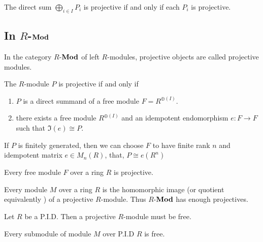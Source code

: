 \documentclass[12pt, oneside]{book}
\begin{document}
\begin{corollary}
    The direct sum $\bigoplus_{i \in I} {P}_i$ is projective if and only if each ${P}_i$ is projective.
\end{corollary}

\subsection{In $R$-$\mathbf{Mod}$}
In the category $R$-$\mathbf{Mod}$ of left $R$-modules, projective objects are called projective modules.


\begin{theorem}
    \label{thm: Equivalent conditions of projective}
    The $R$-module $P$ is projective if and only if
    \begin{enumerate}
        \item
              $P$ is a direct summand of a free module $F=R^{\oplus(I)}$.
        \item
              there exists a free module $R^{\oplus(I)}$ and an idempotent endomorphism $e:F\rightarrow F$ such that $\Im\left( e \right)\cong P$.
    \end{enumerate}
    \begin{remark}
        If $P$ is finitely generated, then we can choose $F$ to have finite rank $n$ and idempotent matrix $e\in M_n\left( R \right)$, that, $P\cong e \left(R^n \right)$
    \end{remark}
\end{theorem}


\begin{theorem}
    \label{thm: Free module is projective}
    Every free module $F$ over a ring $R$ is projective.
\end{theorem}

\begin{corollary}
    \label{cor: Every module $M$ over a ring $R$ is the homomorphic image of a projective $R$-module.}
    Every module $M$ over a ring $R$ is the homomorphic image (or quotient equivalently ) of a projective $R$-module.
    Thus $R$-$\mathbf{Mod}$ has enough projectives.
\end{corollary}










\begin{theorem}
    Let $R$ be a P.I.D.
    Then a projective $R$-module must be free.
\end{theorem}
\begin{corollary}
    Every submodule of module $M$ over P.I.D $R$ is free.
\end{corollary}
\end{document}
